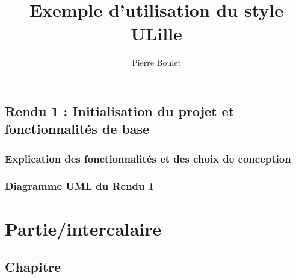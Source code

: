 \documentclass[fontsize=10pt,oneside]{scrreprt}
\title{Exemple d'utilisation du style ULille}
\author{Pierre Boulet}
\begin{document}
\maketitle

\pagecolor{Blanc}

\tableofcontents

\chapter{Rendu 1 : Initialisation du projet et fonctionnalités de base}

\section{Explication des fonctionnalités et des choix de conception}

\section*{Diagramme UML du Rendu 1} %


\part*{Partie/intercalaire}

\chapter{Chapitre}
\end{document}
